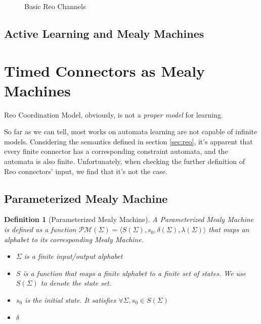 \documentclass[conference, a4paper]{IEEEtran}
\newtheorem{definition}{Definition}
\begin{document}
\begin{figure}[h]
  \begin{center}
    
  \end{center}
  \caption{Basic Reo Channels}
  \label{fig:basic}
\end{figure}

\subsection{Active Learning and Mealy Machines}

\section{Timed Connectors as Mealy Machines}

Reo Coordination Model, obviously, is not a \emph{proper model} for learning. 

So far as we can tell, most works\cite{DBLP:conf/fase/RaffeltS06} on automata learning are not
capable of infinite models.  Considering the semantics defined in section
\ref{sec:reo}, it's apparent that every finite connector has a corresponding constraint
automata, and the automata is also finite. Unfortunately, when checking the further definition of
Reo connectors' input, we find that it's not the case.


\subsection{Parameterized Mealy Machine}
\begin{definition}[Parameterized Mealy Machine]
  A \emph{Parameterized Mealy Machine} is defined as a function $\mathcal{PM}(\Sigma)=\langle S(\Sigma), s_0,
  \delta(\Sigma), \lambda(\Sigma)\rangle$ that maps an alphabet to its corresponding Mealy Machine.
  \begin{itemize}
    \item[-] $\Sigma$ is a \emph{finite} input/output alphabet
    \item[-] $S$ is a function that maps a \emph{finite} alphabet to a \emph{finite} set of
      states. We use $S(\Sigma)$ to denote the state set.
    \item[-] $s_0$ is the initial state. It satisfies $\forall \Sigma,s_0\in S(\Sigma)$
    \item[-] $\delta$ 
  \end{itemize}
\end{definition}
\end{document}
